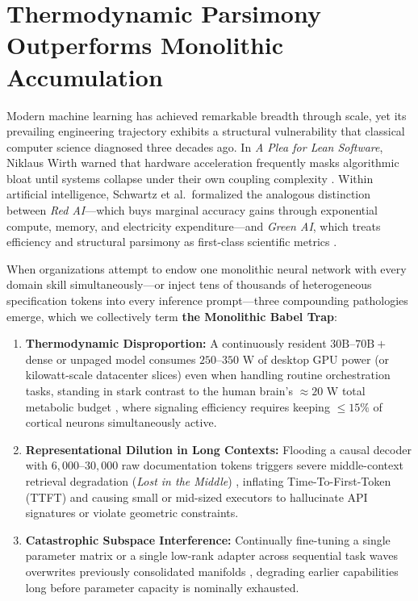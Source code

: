 \documentclass[10pt,a4paper]{article}
\begin{document}
\section{Thermodynamic Parsimony Outperforms Monolithic Accumulation}

Modern machine learning has achieved remarkable breadth through scale, yet its prevailing engineering trajectory exhibits a structural vulnerability that classical computer science diagnosed three decades ago. In \textit{A Plea for Lean Software}, Niklaus Wirth warned that hardware acceleration frequently masks algorithmic bloat until systems collapse under their own coupling complexity \cite{wirth1995lean}. Within artificial intelligence, Schwartz et al.\ formalized the analogous distinction between \textit{Red AI}---which buys marginal accuracy gains through exponential compute, memory, and electricity expenditure---and \textit{Green AI}, which treats efficiency and structural parsimony as first-class scientific metrics \cite{schwartz2020green}.

When organizations attempt to endow one monolithic neural network with every domain skill simultaneously---or inject tens of thousands of heterogeneous specification tokens into every inference prompt---three compounding pathologies emerge, which we collectively term \textbf{the Monolithic Babel Trap}:
\begin{enumerate}
  \item \textbf{Thermodynamic Disproportion:} A continuously resident $30\text{B}\text{--}70\text{B}+$ dense or unpaged model consumes $250\text{--}350\text{ W}$ of desktop GPU power (or kilowatt-scale datacenter slices) even when handling routine orchestration tasks, standing in stark contrast to the human brain's $\approx 20\text{ W}$ total metabolic budget \cite{kandel2021principles,attwell2001energy}, where signaling efficiency requires keeping $\le 15\%$ of cortical neurons simultaneously active.
  \item \textbf{Representational Dilution in Long Contexts:} Flooding a causal decoder with $6,000\text{--}30,000$ raw documentation tokens triggers severe middle-context retrieval degradation (\textit{Lost in the Middle}) \cite{liu2024lost}, inflating Time-To-First-Token (TTFT) and causing small or mid-sized executors to hallucinate API signatures or violate geometric constraints.
  \item \textbf{Catastrophic Subspace Interference:} Continually fine-tuning a single parameter matrix or a single low-rank adapter across sequential task waves overwrites previously consolidated manifolds \cite{kirkpatrick2017ewc,chaudhry2018rwalk}, degrading earlier capabilities long before parameter capacity is nominally exhausted.
\end{enumerate}
\end{document}
